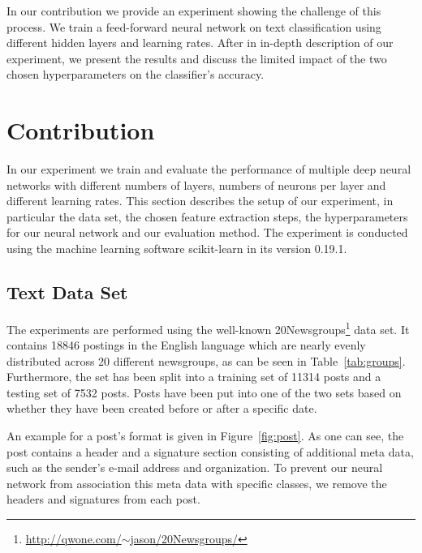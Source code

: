 \documentclass[sigconf]{acmart}
\begin{document}
In our contribution we provide an experiment showing the challenge of this process. We train a feed-forward neural network on text classification using different hidden layers and learning rates. After in in-depth description of our experiment, we present the results and discuss the limited impact of the two chosen hyperparameters on the classifier's accuracy. 

\section{Contribution}

In our experiment we train and evaluate the performance of multiple deep neural networks with different numbers of layers, numbers of neurons per layer and different learning rates.
This section describes the setup of our experiment, in particular the data set, the chosen feature extraction steps, the hyperparameters for our neural network and our evaluation method. The experiment is conducted using the machine learning software scikit-learn\cite{scikit-learn} in its version 0.19.1.

\subsection{Text Data Set}

The experiments are performed using the well-known 20Newsgroups\footnote{\href{http://qwone.com/~jason/20Newsgroups/}{http://qwone.com/$\sim$jason/20Newsgroups/}} data set. It contains 18846 postings in the English language which are nearly evenly distributed across 20 different newsgroups, as can be seen in Table~\ref{tab:groups}. Furthermore, the set has been split into a training set of 11314 posts and a testing set of 7532 posts. Posts have been put into one of the two sets based on whether they have been created before or after a specific date\cite{sklearn-newsgroup}.

An example for a post's format is given in Figure~\ref{fig:post}. As one can see, the post contains a header and a signature section consisting of additional meta data, such as the sender's e-mail address and organization. To prevent our neural network from association this meta data with specific classes, we remove the headers and signatures from each post.
\end{document}
